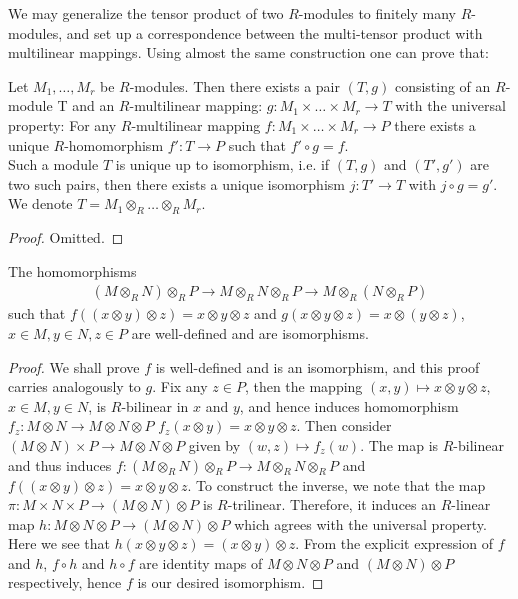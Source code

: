 \noindent
We may generalize the tensor product of two $R$-modules to finitely many
$R$-modules, and set up a
correspondence between the multi-tensor product with multilinear mappings.
Using almost the same construction
one can prove that:

\begin{lemma}
\label{lemma-multilinear}
Let $M_1, \ldots, M_r$ be $R$-modules.
Then there exists a pair $(T, g)$ consisting
of an $R$-module T and an
$R$-multilinear mapping:
$g : M_1\times \ldots\times M_r\rightarrow T$ with the universal
property: For any $R$-multilinear
mapping $f : M_1\times \ldots \times M_r\rightarrow P$ there exists a unique
$R$-homomorphism $f' : T\rightarrow P$ such that
$f'\circ g = f$. \\
Such a module $T$ is unique up to isomorphism, i.e. if $(T, g)$ and $(T', g')$
are two such pairs, then there exists a unique isomorphism
$j : T'\rightarrow T$ with $j\circ g = g'$. We denote
$T = M_1\otimes_R \ldots \otimes_R M_r$.
\end{lemma}

\begin{proof}
Omitted.
\end{proof}

\begin{lemma}
\label{lemma-transitive}
The homomorphisms
\begin{align}
(M\otimes_R N)\otimes_R P\rightarrow
M\otimes_R N\otimes_R P\rightarrow
M\otimes_R (N\otimes_R P)
\end{align}
such that
$f((x\otimes y)\otimes z) = x\otimes y\otimes z$
and $g(x\otimes y\otimes z) = x\otimes (y\otimes z)$,
$x\in M, y\in N, z\in P$ are well-defined and are isomorphisms.
\end{lemma}

\begin{proof}
We shall prove $f$ is well-defined and is an isomorphism, and this proof
carries analogously to $g$. Fix any
$z\in P$, then the mapping $(x, y)\mapsto x\otimes y\otimes z$,
$x\in M, y\in N$, is $R$-bilinear in $x$ and $y$,
and hence induces homomorphism $f_z : M\otimes N\rightarrow M\otimes N\otimes P$
$f_z(x\otimes y) = x\otimes y\otimes z$.
Then consider $(M\otimes N)\times P\rightarrow M\otimes N\otimes P$ given by
$(w, z)\mapsto f_z(w)$. The map is
$R$-bilinear and thus induces
$f : (M\otimes_R N)\otimes_R P\rightarrow M\otimes_R N\otimes_R P$
and $f((x\otimes y)\otimes z) = x\otimes y\otimes z$.
To construct the inverse, we note that the map
$\pi : M\times N\times P\rightarrow (M\otimes N)\otimes P$ is
$R$-trilinear.
Therefore, it induces an $R$-linear map
$h : M\otimes N\otimes P\rightarrow (M\otimes N)\otimes P$ which
agrees with the universal property. Here we see that
$h(x\otimes y\otimes z) = (x\otimes y)\otimes z$.
From the explicit expression of $f$ and $h$, $f\circ h$ and $h\circ f$ are
identity maps of $M\otimes N\otimes
P$ and $(M\otimes N)\otimes P$ respectively, hence $f$ is our desired
isomorphism.
\end{proof}

